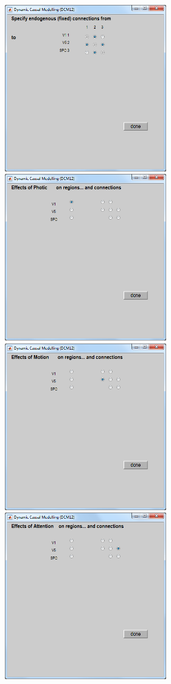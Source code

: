 \begin{figure}
\begin{center}
\includegraphics[width=70mm]{dcm/Fig4}
\includegraphics[width=70mm]{dcm/Fig5}
\includegraphics[width=70mm]{dcm/Fig6}
\includegraphics[width=70mm]{dcm/Fig7}

\end{center}
\end{figure}
